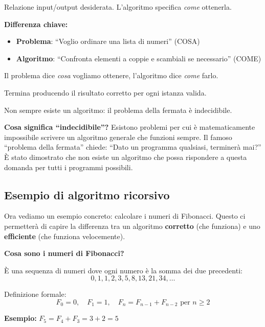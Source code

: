 \begin{definizione}
	Relazione input/output desiderata. L'algoritmo specifica \textit{come} ottenerla.
\end{definizione}

\begin{softnote}
	\textbf{Differenza chiave:}
	\begin{itemize}
		\item \textbf{Problema}: ``Voglio ordinare una lista di numeri'' (COSA)
		\item \textbf{Algoritmo}: ``Confronta elementi a coppie e scambiali se necessario'' (COME)
	\end{itemize}
	Il problema dice \textit{cosa} vogliamo ottenere, l'algoritmo dice \textit{come} farlo.
\end{softnote}

\begin{definizione}
	Termina producendo il risultato corretto per ogni istanza valida.
\end{definizione}

\begin{osservazione}
	Non sempre esiste un algoritmo: il problema della fermata è indecidibile.
\end{osservazione}

\begin{nota}
	\textbf{Cosa significa ``indecidibile''?} Esistono problemi per cui è matematicamente impossibile scrivere un algoritmo generale che funzioni sempre. Il famoso ``problema della fermata'' chiede: ``Dato un programma qualsiasi, terminerà mai?'' È stato dimostrato che non esiste un algoritmo che possa rispondere a questa domanda per tutti i programmi possibili.
\end{nota}


\subsection{Esempio di algoritmo ricorsivo}

\begin{softnote}
	Ora vediamo un esempio concreto: calcolare i numeri di Fibonacci. Questo ci permetterà di capire la differenza tra un algoritmo \textbf{corretto} (che funziona) e uno \textbf{efficiente} (che funziona velocemente).
\end{softnote}

\begin{nota}
	\textbf{Cosa sono i numeri di Fibonacci?}
	
	È una sequenza di numeri dove ogni numero è la somma dei due precedenti:
	\[
	0, 1, 1, 2, 3, 5, 8, 13, 21, 34, \ldots
	\]
	
	Definizione formale:
	\[
	F_0 = 0, \quad F_1 = 1, \quad F_n = F_{n-1} + F_{n-2} \text{ per } n \geq 2
	\]
	
	\textbf{Esempio:} $F_5 = F_4 + F_3 = 3 + 2 = 5$
\end{nota}

